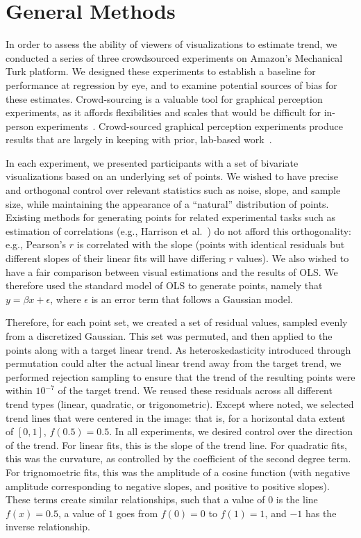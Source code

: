 \documentclass{sigchi}
\begin{document}
\section{General Methods}

\expFig

In order to assess the ability of viewers of visualizations to estimate trend, we conducted a series of three crowdsourced experiments on Amazon's Mechanical Turk platform. We designed these experiments to establish a baseline for performance at regression by eye, and to examine potential sources of bias for these estimates. Crowd-sourcing is a valuable tool for graphical perception experiments, as it affords flexibilities and scales that would be difficult for in-person experiments~\cite{heer2010crowdsourcing}. Crowd-sourced graphical perception experiments produce results that are largely in keeping with prior, lab-based work~\cite{talbot2014four}.

In each experiment, we presented participants with a set of bivariate visualizations based on an underlying set of points. We wished to have precise and orthogonal control over relevant statistics such as noise, slope, and sample size, while maintaining the appearance of a ``natural'' distribution of points. Existing methods for generating points for related experimental tasks such as estimation of correlations (e.g., Harrison et al.~\cite{harrison2014ranking}) do not afford this orthogonality: e.g., Pearson's $r$ is correlated with the slope (points with identical residuals but different slopes of their linear fits will have differing $r$ values). We also wished to have a fair comparison between visual estimations and the results of OLS. We therefore used the standard model of OLS to generate points, namely that $y=\beta x + \epsilon$, where $\epsilon$ is an error term that follows a Gaussian model.

Therefore, for each point set, we created a set of residual values, sampled evenly from a discretized Gaussian. This set was permuted, and then applied to the points along with a target linear trend. As heteroskedasticity introduced through permutation could alter the actual linear trend away from the target trend, we performed rejection sampling to ensure that the trend of the resulting points were within $10^{-7}$ of the target trend. We reused these residuals across all different trend types (linear, quadratic, or trigonometric). Except where noted, we selected trend lines that were centered in the image: that is, for a horizontal data extent of $[0,1]$, $f(0.5) = 0.5$. In all experiments, we desired control over the direction of the trend. For linear fits, this is the slope of the trend line. For quadratic fits, this was the curvature, as controlled by the coefficient of the second degree term. For trignomoetric fits, this was the amplitude of a cosine function (with negative amplitude corresponding to negative slopes, and positive to positive slopes). These terms create similar relationships, such that a value of $0$ is the line $f(x)=0.5$, a value of $1$ goes from $f(0)=0$ to $f(1)=1$, and $-1$ has the inverse relationship.
\end{document}
